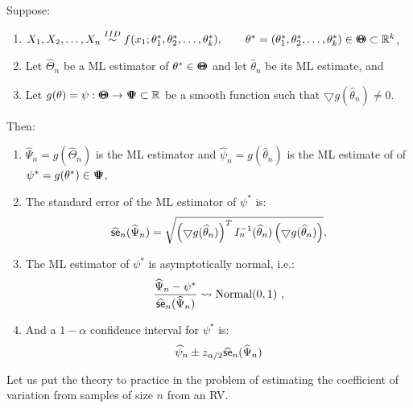 \begin{prop}
Suppose:
\begin{enumerate}
\item $X_1,X_2,\ldots,X_n \overset{IID}{\sim} f(x_1;\theta_1^*,\theta_2^*,\ldots,\theta_k^*), \qquad \theta^*=(\theta_1^*,\theta_2^*,\ldots,\theta_k^*)\in {\Theta}\mspace{-11 mu}{\Theta}\subset \mathbb{R}^k$,
\item Let  $\widehat{\Theta}_n$ be a ML estimator of $\theta^* \in {\Theta}\mspace{-11 mu}{\Theta}$ and let $\widehat{\theta}_n$ be its ML estimate, and
\item Let $g(\theta)=\psi:{\Theta}\mspace{-11 mu}{\Theta} \to {\Psi}\mspace{-11 mu}{\Psi} \subset \mathbb{R}$ be a smooth function such that $\bigtriangledown g(\widehat{\theta}_n) \neq 0$.
\end{enumerate}
Then: 
\begin{enumerate}
\item $\widehat{\Psi}_n = g(\widehat{\Theta}_n)$ is the ML estimator and  $\widehat{\psi}_n = g(\widehat{\theta}_n)$ is the ML estimate of of $\psi^*=g(\theta^*) \in {\Psi}\mspace{-11 mu}{\Psi}$,
\item The standard error of the ML estimator of $\psi^*$ is:
$$\widehat{\sf{se}}_n(\widehat{\Psi}_n) = \sqrt{ \left( \bigtriangledown g(\widehat{\theta}_n) \right)^T I_n^{-1}(\widehat{\theta}_n) \left( \bigtriangledown g(\widehat{\theta}_n) \right)}, $$
\item The ML estimator of $\psi^*$ is asymptotically normal, i.e.:
$$\frac{\widehat{\Psi}_n - \psi^*}{\widehat{\sf{se}}_n(\widehat{\Psi}_n)} \rightsquigarrow \mbox{{\rm Normal}}(0,1) \  ,$$
\item And a $1-\alpha$ confidence interval for $\psi^*$ is:
\[
\widehat{\psi}_n \pm z_{\alpha/2} {\widehat{\sf{se}}_n(\widehat{\Psi}_n)} 
\]
\end{enumerate}
\end{prop}
Let us put the theory to practice in the problem of estimating the coefficient of variation from samples of size $n$ from an RV.
